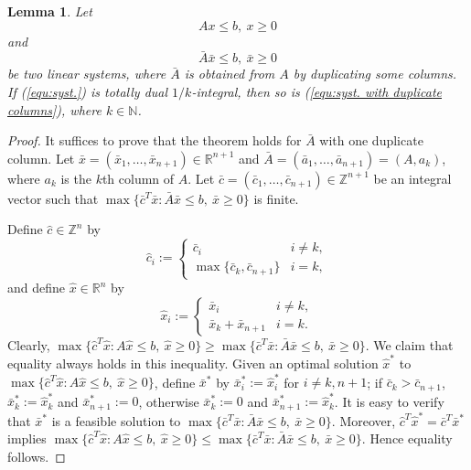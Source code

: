 \documentclass[11pt]{article}
\newtheorem{lemma}[theorem]{Lemma}
\numberwithin{theorem}{section}
\begin{document}
\begin{lemma}
\label{lem:reduct2}
Let 
\begin{equation}\label{equ:syst.}
Ax\leq b,~x\geq 0
\end{equation}
and
\begin{equation}\label{equ:syst. with duplicate columns}
\bar{A}\bar{x}\leq b,~\bar{x}\geq 0
\end{equation}
be two linear systems, where $\bar{A}$ is obtained from $A$ by duplicating some columns. If (\ref{equ:syst.}) is totally dual $1/k$-integral, then so is (\ref{equ:syst. with duplicate columns}), where $k\in \mathbb{N}$.
\end{lemma}
\begin{proof}
It suffices to prove that the theorem holds for $\bar{A}$ with one duplicate column.
Let $\bar{x}=(\bar{x}_1,\ldots,\bar{x}_{n+1})\in\mathbb{R}^{n+1}$ and $\bar{A}=(\bar{a}_1,\ldots,\bar{a}_{n+1})=(A,a_{k})$, where $a_k$ is the $k$th column of $A$. Let $\bar{c}=(\bar{c}_1,\ldots,\bar{c}_{n+1})\in \mathbb{Z}^{n+1}$ be an integral vector such that $\max\{\bar{c}^T \bar{x}: \bar{A}\bar{x}\leq b,~\bar{x}\geq 0\}$ is finite. 

Define $\hat{c}\in \mathbb{Z}^n$ by
\begin{equation*}
\hat{c}_i:=
\begin{cases}
\bar{c}_i & i\not=k,\\
\max\{\bar{c}_k, \bar{c}_{n+1}\} & i=k,
\end{cases}
\end{equation*}
and define $\hat{x}\in \mathbb{R}^n$ by
\begin{equation*}
\hat{x}_i:=
\begin{cases}
\bar{x}_i & i\not=k,\\
\bar{x}_k+\bar{x}_{n+1} & i=k.
\end{cases}
\end{equation*}
Clearly,  $\max\{\hat{c}^T \hat{x}:A\hat{x}\leq b,~\hat{x}\geq 0\}\geq\max\{\bar{c}^T \bar{x}:\bar{A}\bar{x}\leq b,~\bar{x}\geq 0\}$. We claim that equality always holds in this inequality. Given an optimal solution $\hat{x}^*$ to $\max\{\hat{c}^T \hat{x}:A\hat{x}\leq b,~\hat{x}\geq 0\}$, define $\bar{x}^*$ by $\bar{x}^*_i:=\hat{x}^*_i$ for $i\not=k,n+1$; if $\bar{c}_k>\bar{c}_{n+1}$, $\bar{x}^*_k:=\hat{x}^*_k$ and $\bar{x}^*_{n+1}:=0$, otherwise $\bar{x}^*_k:=0$ and $\bar{x}^*_{n+1}:=\hat{x}^*_k$. It is easy to verify that $\bar{x}^*$ is a feasible solution to $\max\{\bar{c}^T \bar{x}:\bar{A}\bar{x}\leq b,~\bar{x}\geq 0\}$. Moreover, $\hat{c}^T\hat{x}^*=\bar{c}^T\bar{x}^*$ implies $\max\{\hat{c}^T \hat{x}:A\hat{x}\leq b,~\hat{x}\geq 0\}\leq\max\{\bar{c}^T \bar{x}:\bar{A}\bar{x}\leq b,~\bar{x}\geq 0\}$. Hence equality follows.


\end{proof}
\end{document}
